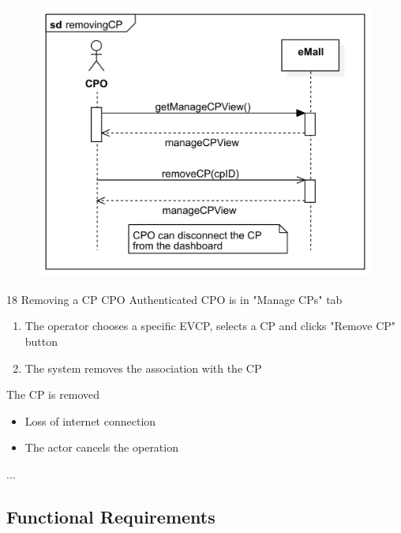 \usecase
{
    \begin{figure}[H]
        \centering
        \includegraphics[scale=0.9]{src/sequence_diagram/removingCP.png}
    \end{figure}
}
{18}
{Removing a CP} %
{CPO} %
{Authenticated CPO is in "Manage CPs" tab} %
{ %
    \begin{enumerate}
        \item The operator chooses a specific EVCP, selects a CP and clicks "Remove CP" button
        \item The system removes the association with the CP
    \end{enumerate}
}
{The CP is removed} %
{ %
    \begin{itemize}
        \item Loss of internet connection
        \item The actor cancels the operation
    \end{itemize}
}
{ %
    ...
}

\subsection{Functional Requirements}


